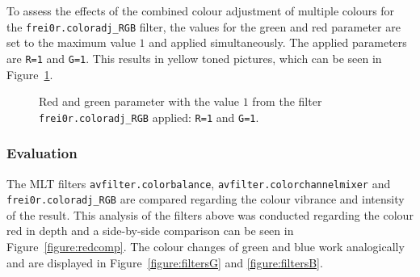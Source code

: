 \documentclass[../MasterThesis.tex]{subfiles}
\begin{document}
To assess the effects of the combined colour adjustment of multiple colours for the \texttt{frei0r.coloradj\_RGB} filter, the values for the green and red parameter are set to the maximum value $1$ and applied simultaneously. The applied parameters are \texttt{R=1} and \texttt{G=1}. This results in yellow toned pictures, which can be seen in Figure~\ref{figure:rg}.


\begin{figure}[H]
	\begin{center}
		\caption[Red and green parameter set to $1$ with \texttt{frei0r.coloradj\_RGB}.]{Red and green parameter with the value $1$ from the filter \texttt{frei0r.coloradj\_RGB} applied: \texttt{R=1} and \texttt{G=1}.}
		\label{figure:rg}
	\end{center}
\end{figure}




\subsubsection*{Evaluation}




The MLT filters \texttt{avfilter.colorbalance}, \texttt{avfilter\-.colorchannelmixer} and \texttt{frei\-0r\-.coloradj\_RGB} are compared regarding the colour vibrance and intensity of the result. This analysis of the filters above was conducted regarding the colour red in depth and a side-by-side comparison can be seen in Figure~\ref{figure:redcomp}. The colour changes of green and blue work analogically and are displayed in Figure~\ref{figure:filtersG} and \ref{figure:filtersB}.
%
\end{document}
